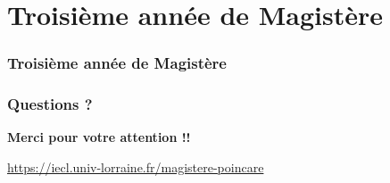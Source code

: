 \documentclass[slidetop,11pt]{beamer}
\begin{document}
 \section{Troisième année de Magistère}
\begin{frame}
\frametitle{Troisième année de Magistère}

\end{frame}


\begin{frame}
\frametitle{Questions ?}

\begin{center}
{\LARGE \bf Merci pour votre attention !!}

\bigskip
{}

\bigskip
\url{https://iecl.univ-lorraine.fr/magistere-poincare}
\end{center}
\end{frame}
  
\end{document}
